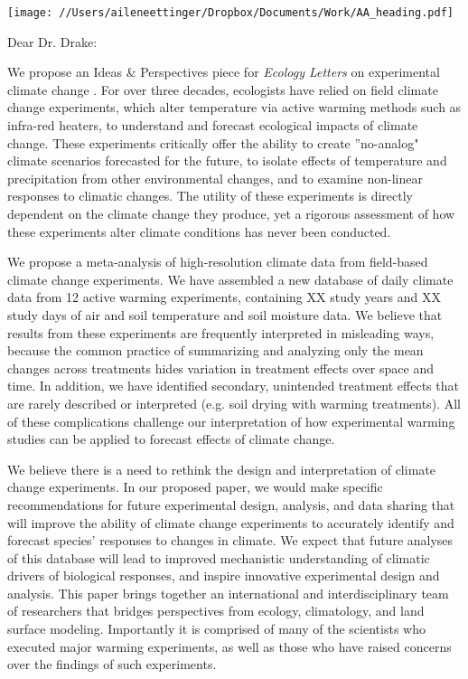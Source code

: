 \documentclass[12pt,a4paper]{letter}
\begin{document}
\begin{letter}{}
\texttt{[image: //Users/aileneettinger/Dropbox/Documents/Work/AA\_heading.pdf]}

\opening{Dear Dr. Drake:}
We propose an Ideas \& Perspectives piece for \emph{Ecology Letters} on experimental climate change . For over three decades, ecologists have relied on field climate change experiments, which alter temperature via active warming methods such as infra-red heaters, to understand and forecast ecological impacts of climate change.  These experiments critically offer the ability to create ''no-analog" climate scenarios forecasted for the future, to isolate effects of temperature and precipitation from other environmental changes, and to examine non-linear responses to climatic changes. The utility of these experiments is directly dependent on the climate change they produce, yet a rigorous assessment of how these experiments alter climate conditions has never been conducted. 

We propose a meta-analysis of high-resolution climate data from field-based climate change experiments. We have assembled a new database of daily climate data from 12 active warming experiments, containing XX study years and XX study days of air and soil temperature and soil moisture data. We believe that results from these experiments are frequently interpreted in misleading ways, because the common practice of summarizing and analyzing only the mean changes across treatments hides variation in treatment effects over space and time. In addition, we have identified secondary, unintended treatment effects that are rarely described or interpreted (e.g. soil drying with warming treatments). All of these complications challenge our interpretation of how experimental warming studies can be applied to forecast effects of climate change.

We believe there is a need to rethink the design and interpretation of climate change experiments. In our proposed paper, we would make specific recommendations for future experimental design, analysis, and data sharing that will improve the ability of climate change experiments to accurately identify and forecast species' responses to changes in climate. We expect that future analyses of this database will lead to improved mechanistic understanding of climatic drivers of biological responses, and inspire innovative experimental design and analysis. This paper brings together an international and interdisciplinary team of researchers that bridges perspectives from ecology, climatology, and land surface modeling. Importantly it is comprised of many of the scientists who executed major warming experiments, as well as those who have raised concerns over the findings of such experiments.


\end{letter}
\end{document}
